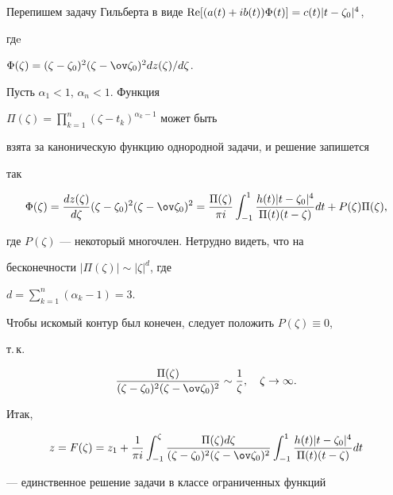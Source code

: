  


Перепишем задачу Гильберта в виде $\re[(a(t)+i 


b(t))\Phi(t)]=c(t)|t-\zeta_0|^4$, 


гдe 


$\Phi(\zeta)=(\zeta-\zeta_0)^2(\zeta-\ov\zeta_0)^2dz(\zeta)/d\zeta$. 


 


Пусть $\alpha_1<1$, $\alpha_n<1$. Функция 


$\Pi(\zeta)=\prod\limits^n_{k=1}(\zeta-t_k)^{\alpha_k-1}$ может быть 


взята за каноническую функцию однородной задачи, и решение запишется 


так


$$ 


\Phi(\zeta)=\frac{dz(\zeta)}{d\zeta} 


(\zeta-\zeta_0)^2(\zeta-\ov\zeta_0)^2=\frac{\Pi(\zeta)}{\pi i} 


\int^1_{-1}\frac{h(t)|t-\zeta_0|^4}{\Pi(t)(t-\zeta)}dt 


+P(\zeta)\Pi(\zeta), 


$$ 


где $P(\zeta)$ --- некоторый многочлен. Нетрудно видеть, что на 


бесконечности $|\Pi(\zeta)|\sim|\zeta|^d$, где 


$d=\sum\limits^n_{k=1}(\alpha_k-1)=3$. 


 


Чтобы искомый контур был конечен, следует положить $P(\zeta)\equiv0$, 


т.\,к. 


$$ 


\frac{\Pi(\zeta)}{(\zeta-\zeta_0)^2(\zeta-\ov\zeta_0)^2} 


\sim\frac{1}{\zeta},\quad \zeta\to\infty. 


$$ 


Итак, 


\begin{equation} 


z=F(\zeta)=z_1+\frac{1}{\pi i}\int^\zeta_{-1} 


\frac{\Pi(\zeta)d\zeta}{(\zeta-\zeta_0)^2(\zeta-\ov\zeta_0)^2} 


\int^1_{-1}\frac{h(t)|t-\zeta_0|^4}{\Pi(t)(t-\zeta)}dt 


\end{equation} 


--- единственное решение задачи в классе ограниченных функций 


